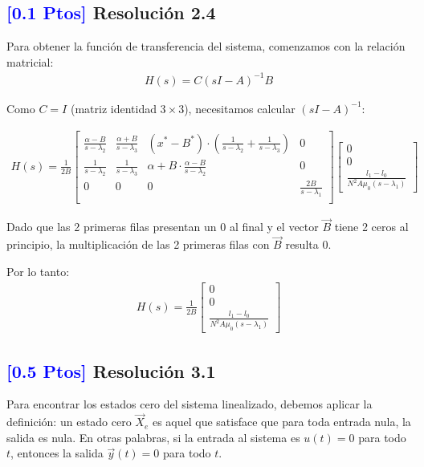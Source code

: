 \documentclass[
  11pt,
  letterpaper,
   addpoints,
   answers
  ]{exam}
\begin{document}
\begin{solution}
\subsection*{\textcolor{blue}{[0.1 Ptos]} Resolución 2.4}

Para obtener la función de transferencia del sistema, comenzamos con la relación matricial:
\begin{align}
H(s) = C(sI - A)^{-1}B
\end{align}

Como $C = I$ (matriz identidad $3 \times 3$), necesitamos calcular $(sI - A)^{-1}$:

\begin{align}
H(s) = \frac{1}{2B} \begin{bmatrix}
\frac{\alpha - B}{s - \lambda_2} & \frac{\alpha + B}{s - \lambda_3} & (x^* - B^*) \cdot \left(\frac{1}{s - \lambda_2} + \frac{1}{s - \lambda_3}\right) & 0 \\
\frac{1}{s - \lambda_2} & \frac{1}{s - \lambda_3} & \alpha + B \cdot \frac{\alpha - B}{s - \lambda_2} & 0 \\
0 & 0 & 0 & \frac{2B}{s - \lambda_1} \\
\end{bmatrix} \begin{bmatrix}
0 \\
0 \\
\frac{l_1 - l_0}{N^2 A \mu_0 (s - \lambda_1)}
\end{bmatrix}
\end{align}

Dado que las 2 primeras filas presentan un 0 al final y el vector $\vec{B}$ tiene 2 ceros al principio, la multiplicación de las 2 primeras filas con $\vec{B}$ resulta 0.

Por lo tanto:
\begin{align}
H(s) = \frac{1}{2B} \begin{bmatrix}
0 \\
0 \\
\frac{l_1 - l_0}{N^2 A \mu_0 (s - \lambda_1)}
\end{bmatrix}
\end{align}

\subsection*{\textcolor{blue}{[0.5 Ptos]} Resolución 3.1}

Para encontrar los estados cero del sistema linealizado, debemos aplicar la definición: un estado cero $\vec{X}_e$ es aquel que satisface que para toda entrada nula, la salida es nula. En otras palabras, si la entrada al sistema es $u(t) = 0$ para todo $t$, entonces la salida $\vec{y}(t) = 0$ para todo $t$.


\end{solution}
\end{document}
